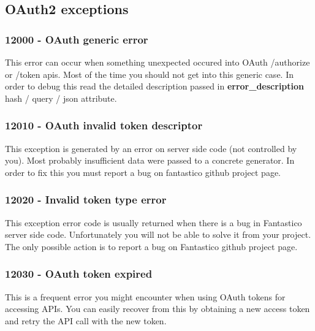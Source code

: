 \documentclass[letterpaper,10pt,english]{sphinxmanual}
\begin{document}
\subsection{OAuth2 exceptions}
\label{features/oauth2:oauth2-exceptions}

\subsubsection{12000 - OAuth generic error}
\label{features/oauth2/exceptions/12000:oauth-generic-error}\label{features/oauth2/exceptions/12000::doc}
This error can occur when something unexpected occured into OAuth /authorize or /token apis. Most of the time you should not
get into this generic case. In order to debug this read the detailed description passed in \textbf{error\_description} hash / query /
json attribute.


\subsubsection{12010 - OAuth invalid token descriptor}
\label{features/oauth2/exceptions/12010::doc}\label{features/oauth2/exceptions/12010:oauth-invalid-token-descriptor}
This exception is generated by an error on server side code (not controlled by you). Most probably insufficient data were
passed to a concrete generator. In order to fix this you must report a bug on fantastico github project page.


\subsubsection{12020 - Invalid token type error}
\label{features/oauth2/exceptions/12020::doc}\label{features/oauth2/exceptions/12020:invalid-token-type-error}
This exception error code is usually returned when there is a bug in Fantastico server side code. Unfortunately you will not be
able to solve it from your project. The only possible action is to report a bug on Fantastico github project page.


\subsubsection{12030 - OAuth token expired}
\label{features/oauth2/exceptions/12030:oauth-token-expired}\label{features/oauth2/exceptions/12030::doc}
This is a frequent error you might encounter when using OAuth tokens for accessing APIs. You can easily recover from this
by obtaining a new access token and retry the API call with the new token.
\end{document}
